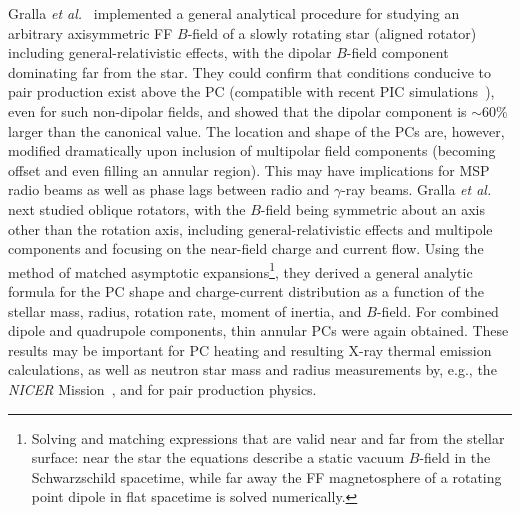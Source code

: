 \documentclass{PoS}
\begin{document}
Gralla \textit{et al.}~\cite{Gralla16} implemented a general analytical procedure for studying an arbitrary axisymmetric FF $B$-field of a slowly rotating star (aligned rotator) including general-relativistic effects, with the dipolar $B$-field component dominating far from the star. They could confirm that conditions conducive to pair production exist above the PC (compatible with recent PIC simulations~\cite{Philippov15b}), even for such non-dipolar fields, and showed that the dipolar component is $\sim60\%$ larger than the canonical value. The location and shape of the PCs are, however, modified dramatically upon inclusion of multipolar field components (becoming offset and even filling an annular region). This may have implications for MSP radio beams as well as phase lags between radio and $\gamma$-ray beams. Gralla \textit{et al.}~\cite{Gralla17} next studied oblique rotators, with the $B$-field being symmetric about an axis other than the rotation axis, including general-relativistic effects and multipole components and focusing on the near-field charge and current flow. Using the method of matched asymptotic expansions\footnote{Solving and matching expressions that are valid near and far from the stellar surface: near the star the equations describe a static vacuum $B$-field in the Schwarzschild spacetime, while far away the FF magnetosphere of a rotating point dipole in flat spacetime is solved numerically.}, they derived a general analytic formula for the PC shape and charge-current distribution as a function of the stellar mass, radius, rotation rate, moment of inertia, and $B$-field. For combined dipole and quadrupole components, thin annular PCs were again obtained. These results may be important for PC heating and resulting X-ray thermal emission calculations, as well as neutron star mass and radius measurements by, e.g., the \textit{NICER} Mission~\cite{Arzoumanian14}, and for pair production physics.
\end{document}
